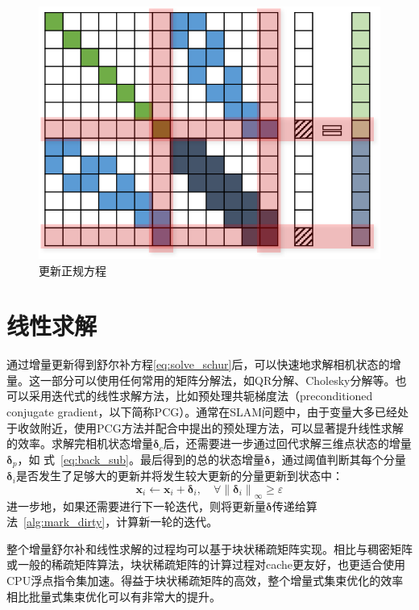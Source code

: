 \begin{figure}[htb!]
    \centering
    \includegraphics[scale=1]{Pictures/normal_eq_update.png}
    \caption{更新正规方程}
    \label{fig:normal_eq_update}
\end{figure}



\section{线性求解}

通过增量更新得到舒尔补方程\eqref{eq:solve_schur}后，可以快速地求解相机状态的增量。这一部分可以使用任何常用的矩阵分解法，如QR分解、Cholesky分解等。也可以采用迭代式的线性求解方法，比如预处理共轭梯度法（preconditioned conjugate gradient，以下简称PCG）。通常在SLAM问题中，由于变量大多已经处于收敛附近，使用PCG方法并配合\citep{jeong2012pushing}中提出的预处理方法，可以显著提升线性求解的效率。求解完相机状态增量$\bm{\delta}_c$后，还需要进一步通过回代求解三维点状态的增量$\bm{\delta}_p$，如 式~\eqref{eq:back_sub}。最后得到的总的状态增量$\bm{\delta}$，通过阈值判断其每个分量$\bm{\delta}_i$是否发生了足够大的更新并将发生较大更新的分量更新到状态中：
\begin{equation}
    \bm{x}_i \leftarrow \bm{x}_i + \bm{\delta}_i, \quad
    \forall \left\|\bm{\delta}_i\right\|_{\infty} \geq \varepsilon
\end{equation}
进一步地，如果还需要进行下一轮迭代，则将更新量$\bm{\delta}$传递给算法~\ref{alg:mark_dirty}，计算新一轮的迭代。

整个增量舒尔补和线性求解的过程均可以基于块状稀疏矩阵实现。相比与稠密矩阵或一般的稀疏矩阵算法，块状稀疏矩阵的计算过程对cache更友好，也更适合使用CPU浮点指令集加速。得益于块状稀疏矩阵的高效，整个增量式集束优化的效率相比批量式集束优化可以有非常大的提升。
